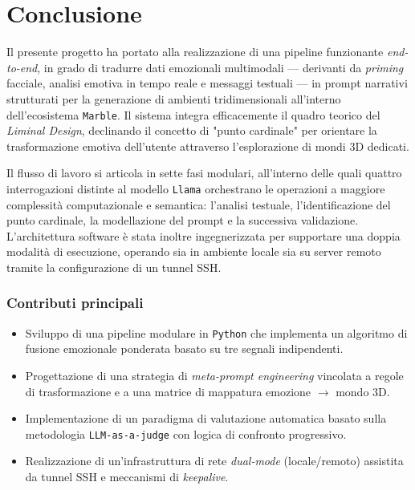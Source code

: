 \documentclass[11pt]{report}
\begin{document}
 
\chapter{Conclusione}
\label{ch:conclusione}
Il presente progetto ha portato alla realizzazione di una pipeline funzionante \textit{end-to-end}, in grado di tradurre dati emozionali multimodali — derivanti da \textit{priming} facciale, analisi emotiva in tempo reale e messaggi testuali — in prompt narrativi strutturati per la generazione di ambienti tridimensionali all'interno dell'ecosistema \texttt{Marble}. Il sistema integra efficacemente il quadro teorico del \textit{Liminal Design}, declinando il concetto di "punto cardinale" per orientare la trasformazione emotiva dell'utente attraverso l'esplorazione di mondi 3D dedicati.

Il flusso di lavoro si articola in sette fasi modulari, all'interno delle quali quattro interrogazioni distinte al modello \texttt{Llama} orchestrano le operazioni a maggiore complessità computazionale e semantica: l'analisi testuale, l'identificazione del punto cardinale, la modellazione del prompt e la successiva validazione. L'architettura software è stata inoltre ingegnerizzata per supportare una doppia modalità di esecuzione, operando sia in ambiente locale sia su server remoto tramite la configurazione di un tunnel SSH.

\subsection*{Contributi principali}
\begin{itemize}
    \item Sviluppo di una pipeline modulare in \texttt{Python} che implementa un algoritmo di fusione emozionale ponderata basato su tre segnali indipendenti.
    \item Progettazione di una strategia di \textit{meta-prompt engineering} vincolata a regole di trasformazione e a una matrice di mappatura emozione $\rightarrow$ mondo 3D.
    \item Implementazione di un paradigma di valutazione automatica basato sulla metodologia \texttt{LLM-as-a-judge} con logica di confronto progressivo.
    \item Realizzazione di un'infrastruttura di rete \textit{dual-mode} (locale/remoto) assistita da tunnel SSH e meccanismi di \textit{keepalive}.
\end{itemize}
\end{document}
